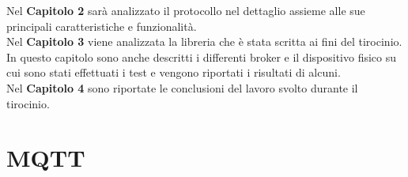 \documentclass[binding=0.6cm,TFA]{sapthesis}
\begin{document}
\begin{large}
Nel \textbf{Capitolo 2} sarà analizzato il protocollo nel dettaglio assieme alle sue principali caratteristiche e funzionalità. \\

Nel \textbf{Capitolo 3} viene analizzata la libreria che è stata scritta ai fini del tirocinio. In questo capitolo sono anche descritti i differenti broker e il dispositivo fisico su cui sono stati effettuati i test e vengono riportati i risultati di alcuni. \\

Nel \textbf{Capitolo 4} sono riportate le conclusioni del lavoro svolto durante il tirocinio.

\end{large}


\chapter{MQTT}
\end{document}
